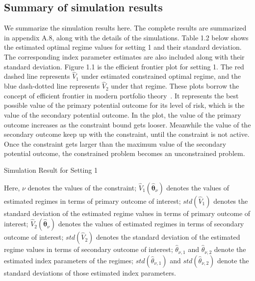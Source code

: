 \documentclass{article}
\newcommand{\wh}{\widehat}
\newcommand{\bs}{ \boldsymbol}
\begin{document}
\subsection{Summary of simulation results}
We summarize the simulation results here. The complete results are summarized in appendix A.8, along with the details of the simulations. Table 1.2 below shows the estimated optimal regime values for setting 1 and their standard deviation. The corresponding index parameter estimates are also included along with their standard deviation. Figure 1.1 is the efficient frontier plot for setting 1. The red dashed line represents $\wh{V}_1$ under estimated constrained optimal regime, and the blue dash-dotted line represents $\wh{V}_2$ under that regime. These plots borrow the concept of efficient frontier in modern portfolio theory~\cite{Markowitz1952}. It represents the best possible value of the primary potential outcome for its level of risk, which is the value of the secondary potential outcome. In the plot, the value of the primary outcome increases as the constraint bound gets looser. Meanwhile the value of the secondary outcome keep up with the constraint, until the constraint is not active. Once the constraint gets larger than the maximum value of the secondary potential outcome, the constrained problem becomes an unconstrained problem. \\

\begin{table}[!htbp]
\caption {Simulation Result for Setting 1}
	\centering
	{\tt
		
	}
\justify
Here, $\nu$ denotes the values of the constraint; $\wh{V}_1(\wh{\bs{\theta}}_{\nu})$ denotes the values of estimated regimes in terms of primary outcome of interest; $std(\wh{V}_1)$ denotes the standard deviation of the estimated regime values in terms of primary outcome of interest; $\wh{V}_2(\wh{\bs{\theta}}_{\nu})$ denotes the values of estimated regimes in terms of secondary outcome of interest; $std(\wh{V}_2)$ denotes the standard deviation of the estimated regime values in terms of secondary outcome of interest; $\wh{\theta}_{\nu,1}$ and $\wh{\theta}_{\nu,2}$ denote the estimated index parameters of the regimes; $std(\wh{\theta}_{\nu,1})$ and $std(\wh{\theta}_{\nu,2})$ denote the standard deviations of those estimated index parameters.	
\end{table} 
\end{document}
